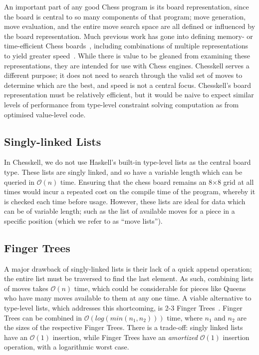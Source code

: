 An important part of any good Chess program is its board representation, since the board is central to so many components of that program; move generation, move evaluation, and the entire move search space are all defined or influenced by the board representation. Much previous work has gone into defining memory- or time-efficient Chess boards~\cite{bitboard,searchtables}, including combinations of multiple representations to yield greater speed~\cite{bitandccr}. While there is value to be gleaned from examining these representations, they are intended for use with Chess engines. Chesskell serves a different purpose; it does not need to search through the valid set of moves to determine which are the best, and speed is not a central focus. Chesskell's board representation must be relatively efficient, but it would be naive to expect similar levels of performance from type-level constraint solving computation as from optimised value-level code.

\subsection{Singly-linked Lists}

In Chesskell, we do not use Haskell's built-in type-level lists as the central board type. These lists are singly linked, and so have a variable length which can be queried in $\mathcal{O}(n)$ time. Ensuring that the chess board remains an 8×8 grid at all times would incur a repeated cost on the compile time of the program, whereby it is checked each time before usage. However, these lists are ideal for data which can be of variable length; such as the list of available moves for a piece in a specific position (which we refer to as ``move lists'').

\subsection{Finger Trees} \label{fingertreedesign}

A major drawback of singly-linked lists is their lack of a quick append operation; the entire list must be traversed to find the last element. As such, combining lists of moves takes $\mathcal{O}(n)$ time, which could be considerable for pieces like Queens who have many moves available to them at any one time. A viable alternative to type-level lists, which addresses this shortcoming, is 2-3 Finger Trees~\cite{fingertrees}. Finger Trees can be combined in $\mathcal{O}(log(min(n_{1}, n_{2})))$ time, where $n_{1}$ and $n_{2}$ are the sizes of the respective Finger Trees. There is a trade-off: singly linked lists have an $\mathcal{O}(1)$ insertion, while Finger Trees have an \emph{amortized} $\mathcal{O}(1)$ insertion operation, with a logarithmic worst case.

